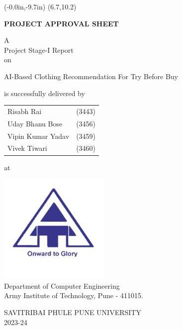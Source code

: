 \thisfancyput(-0.0in,-9.7in){
	\setlength{\unitlength}{1in}
	\framebox(6.7,10.2)
}
\setlength{\parindent}{0mm}
\begin{center}
	\vspace*{0.5 \baselineskip}

	{
		\bfseries
		PROJECT APPROVAL SHEET
		\vspace*{\baselineskip}
	}
		
	A \\ Project Stage-I Report \\ on
	\vspace*{\baselineskip}

	AI-Based Clothing Recommendation For Try Before Buy \\
	\vspace*{1.5\baselineskip}

	is successfully delivered by
	
	\vspace*{\baselineskip}

	\begin{table}[h!]
		\centering
		\begin{tabular}{ l r }
			Risabh Rai \hspace{25mm} & (3443) \\
			Uday Bhanu Bose \hspace{25mm} & (3456) \\
			Vipin Kumar Yadav \hspace{25mm} & (3459) \\
			Vivek Tiwari \hspace{25mm} & (3460) \\
		\end{tabular}
	\end{table}
	
	\vspace*{\baselineskip}
	
	at

	\vspace*{\baselineskip}

	\includegraphics[scale=0.75]{components/images/logo.png} \\[0.5cm]
	
	Department of Computer Engineering \\
	Army Institute of Technology, Pune - 411015.\\
	\vspace*{0.5\baselineskip}
	
	SAVITRIBAI PHULE PUNE UNIVERSITY \\
	2023-24
\end{center}

